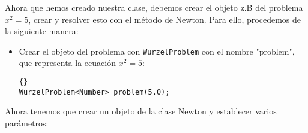 \documentclass[a4paper,11pt]{article}
\theoremstyle{definition}
\begin{document}
\noindent
Ahora que hemos creado nuestra clase, debemos crear el objeto z.B del problema 
$x^2=5$, crear y resolver esto con el método de Newton.  Para ello,
procedemos de la siguiente manera:

\begin{itemize}
  \item Crear el objeto del problema con \lstinline{WurzelProblem} con el nombre
     "problem", que representa la ecuación $x^2=5$:

  {\footnotesize{\begin{lstlisting}{}
WurzelProblem<Number> problem(5.0);
\end{lstlisting}}}
\end{itemize}

\noindent
Ahora tenemos que crear un objeto de la clase Newton y establecer varios parámetros:
\end{document}
